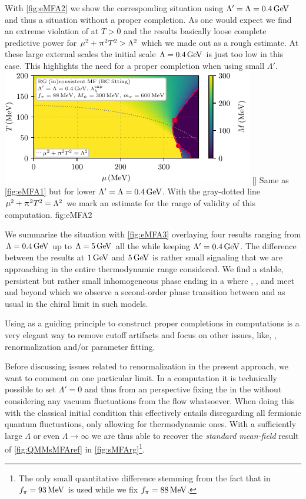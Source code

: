 With \cref{fig:eMFA2} we show the corresponding situation using $\Lambda'=\Lambda=0.4\,\mathrm{GeV}$ and thus a situation without a proper \uv{} completion.
As one would expect we find an extreme violation of \rgcy{} at $T>0$ and the results basically loose complete predictive power for $\mu^2+\mkern1.0mu\uppi\mkern1.0mu^2 T^2>\Lambda^2$ which we made out as a rough estimate. At these large external scales the initial scale $\Lambda=0.4\,\mathrm{GeV}$ is just too low in this case. This highlights the need for a proper \rgct{} \uv{} completion when using small $\Lambda'$.
\customWidthFigure%
	{%
	\includegraphics[width=11cm]{qmm/figures/eMFA_QMMCDW_PD_BC_04_04_88_300_600.pdf}
	}%
	[]
	{%
	Same as \cref{fig:eMFA1} but for lower $\Lambda'=\Lambda=0.4\, \mathrm{GeV}$. With the gray-dotted line ${\mu^2+\mkern1.0mu\uppi\mkern1.0mu^2T^2=\Lambda^2}$ we mark an \aposteriori{} estimate for the range of validity of this computation.
	}%
	{fig:eMFA2}

We summarize the situation with \cref{fig:eMFA3} overlaying four results ranging  from $\Lambda=0.4\,\mathrm{GeV}$ up to $\Lambda=5\,\mathrm{GeV}$ all the while keeping $\Lambda'=0.4\,\mathrm{GeV}$. The difference between the results at $1\,\mathrm{GeV}$ and $5\,\mathrm{GeV}$ is rather small signaling that we are approaching \rgcy{} in the entire thermodynamic range considered.
We find a stable, persistent but rather small inhomogeneous phase ending in a \lp{} where \hbp{}, \ip{}, and \symp{} meet and beyond which we observe a second-order phase transition between \hbp{} and \symp{} as usual in the chiral limit in such models.

Using \rgcy{} as a guiding principle to construct proper \uv{} completions in \mf{} computations is a very elegant way to remove cutoff artifacts and focus on other issues, like, \eg{}, renormalization and/or parameter fitting.

Before discussing issues related to renormalization in the present approach, we want to comment on one particular limit. In a \rgct{} \mf{} computation it is technically possible to set $\Lambda'=0$ and thus \dash{} from an \frg{} perspective \dash{} fixing the \ea{} in the \ir{} without considering any vacuum fluctuations from the flow whatsoever. When doing this with the classical initial condition this effectively entails disregarding all fermionic quantum fluctuations, only allowing for thermodynamic ones. With a sufficiently large $\Lambda$ or even $\Lambda\rightarrow\infty$ we are thus able to recover the \textit{standard mean-field} result of \cref{fig:QMMsMFAref} in \cref{fig:sMFArg}\footnote{The only small quantitative difference stemming from the fact that in  $f_\pi=93\,\mathrm{MeV}$ is used while we fix $f_\pi=88\,\mathrm{MeV}$.}.\clearpage


